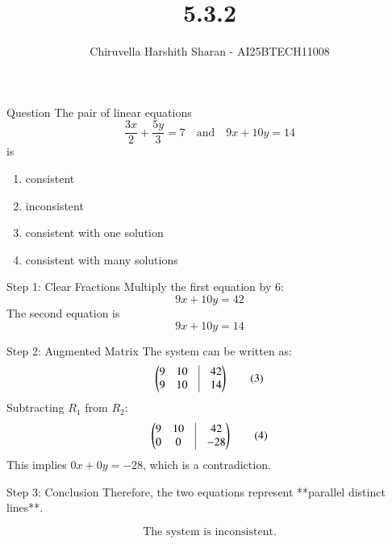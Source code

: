 \documentclass{beamer}
\title{5.3.2}
\author{Chiruvella Harshith Sharan - AI25BTECH11008}
\begin{document}
\frame{\titlepage}


\begin{frame}{Question}
The pair of linear equations
\[
\frac{3x}{2} + \frac{5y}{3} = 7 
\quad \text{and} \quad 
9x + 10y = 14
\]
is

\begin{enumerate}[label=(\alph*)]
\item consistent 
\item inconsistent 
\item consistent with one solution 
\item consistent with many solutions
\end{enumerate}
\end{frame}


\begin{frame}{Step 1: Clear Fractions}
Multiply the first equation by $6$:
\[
9x + 10y = 42 \tag{1}
\]
The second equation is
\[
9x + 10y = 14 \tag{2}
\]
\end{frame}


\begin{frame}{Step 2: Augmented Matrix}
The system can be written as:
\[
\begin{pmatrix}
9 & 10 & \vline & 42 \\
9 & 10 & \vline & 14
\end{pmatrix} \tag{3}
\]
Subtracting $R_1$ from $R_2$:
\[
\begin{pmatrix}
9 & 10 & \vline & 42 \\
0 & 0 & \vline & -28
\end{pmatrix} \tag{4}
\]
This implies $0x + 0y = -28$, which is a contradiction.
\end{frame}


\begin{frame}{Step 3: Conclusion}
Therefore, the two equations represent **parallel distinct lines**.

\[
\boxed{\text{The system is inconsistent.}}
\]
\end{frame}

\end{document}
